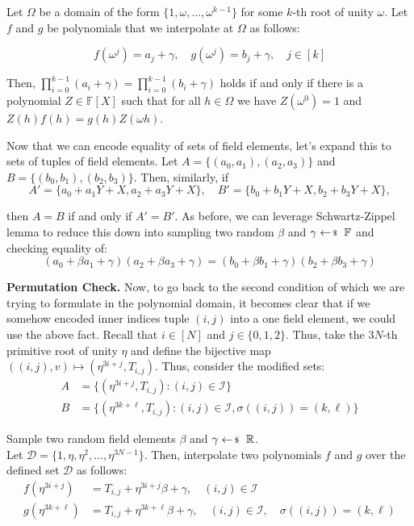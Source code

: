 \documentclass[../lecture-notes-148x210.tex]{subfiles}
\begin{document}
Let $\Omega$ be a domain of the form \(\{1, \omega, \dots, \omega^{k-1}\}\) for
some $k$-th root of unity $\omega$. Let $f$ and $g$ be polynomials that we
interpolate at $\Omega$ as follows:

\begin{equation*}
    f(\omega^j) = a_j + \gamma, \quad g(\omega^j) = b_j + \gamma, \quad j \in [k]
\end{equation*}

Then, \(\prod_{i=0}^{k-1} (a_i + \gamma) = \prod_{i=0}^{k-1} (b_i + \gamma)\) holds if and only if there is a polynomial $Z \in \mathbb{F}[X]$ such that for all $h \in \Omega$ we have $Z(\omega^{0}) = 1$ and $Z(h)f(h) = g(h)Z(\omega h)$.

Now that we can encode equality of sets of field elements, let's expand this to sets of tuples of field elements. Let \(A = \{(a_0, a_1), (a_2, a_3)\}\) and \(B = \{(b_0, b_1), (b_2, b_3)\}\). Then, similarly, if
\[A' = \{a_0 + a_1Y + X, a_2 + a_3Y + X\}, \quad B' = \{b_0 + b_1Y + X, b_2 + b_3Y + X\},\]

then $A=B$ if and only if $A'=B'$. As before, we can leverage Schwartz-Zippel lemma to reduce this down into sampling two random $\beta$ and $\gamma \leftarrowS \mathbb{F}$ and checking equality of:
\begin{equation*}
    (a_0 + \beta a_1 + \gamma)(a_2 + \beta a_3 + \gamma) = (b_0 + \beta b_1 + \gamma)(b_2 + \beta b_3 + \gamma)
\end{equation*}

\textbf{Permutation Check.} Now, to go back to the second condition of
 which we are trying to formulate in the polynomial
domain, it becomes clear that if we somehow encoded inner indices tuple $(i, j)$
into a one field element, we could use the above fact. Recall that $i \in [N]$
and $j \in \{0,1,2\}$. Thus, take the $3N$-th primitive root of unity $\eta$ and
define the bijective map $((i,j),v) \mapsto (\eta^{3i+j}, T_{i,j})$. Thus,
consider the modified sets:
\begin{align*}
    A &= \{(\eta^{3i+j}, T_{i,j}) : (i, j) \in \mathcal{I}\} \\
    B &= \{(\eta^{3k+\ell}, T_{i,j}) : (i, j) \in \mathcal{I}, \sigma((i, j)) = (k, \ell)\}
\end{align*}

Sample two random field elements $\beta$ and $\gamma \leftarrowS \mathbb{R}$. \\
Let $\mathcal{D} = \{1, \eta, \eta^2, \ldots, \eta^{3N-1}\}$. Then, interpolate two 
polynomials $f$ and $g$ over the defined set $\mathcal{D}$ as follows:
\begin{align*}
    f(\eta^{3i+j}) &= T_{i,j} + \eta^{3i+j}\beta + \gamma, \quad (i, j) \in \mathcal{I} \\
    g(\eta^{3k+\ell}) &= T_{i,j} + \eta^{3k+\ell}\beta + \gamma, \quad (i, j) \in \mathcal{I}, \quad \sigma((i, j)) = (k, \ell)
\end{align*}
\end{document}
